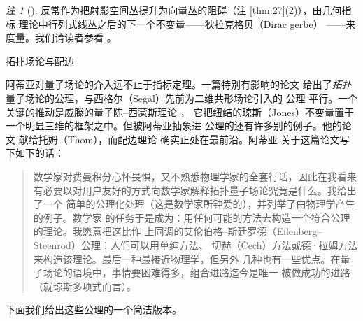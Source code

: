 \documentclass[11pt]{amsart}
\makeatletter
\def\subsection{\@startsection{subsection}{2}%
   \z@{1.25\linespacing\@plus.7\linespacing}{.5\linespacing}%
   {\normalfont\bfseries}}
\theoremstyle{definition}
\theoremstyle{remark}
\newtheorem{remark}[equation]{注}
\theoremstyle{plain}
\numberwithin{equation}{section}
\renewcommand{\:}{\colon}
\newcommand{\QQ}{{\mathbb Q}}
\newcommand{\ZZ}{{\mathbb Z}}
\DeclareMathOperator{\SO}{SO}
\DeclareMathOperator{\Sign}{Sign}
\makeatother
\begin{document}
   \begin{remark}[]\label{thm:33}
  反常作为把射影空间丛提升为向量丛的阻碍（注 \ref{thm:27}(2)），由几何指标
 理论中行列式线丛之后的下一个不变量——狄拉克格贝（Dirac gerbe）
  \cite{Lt1,Bu}——来度量。我们请读者参看 \cite{FS,Seg2,NAg}。
   \end{remark}

   \subsection{拓扑场论与配边}\label{subsec:8.2}

阿蒂亚对量子场论的介入远不止于指标定理。一篇特别有影响的论文 \cite{A11}
给出了\emph{拓扑}量子场论的公理，与西格尔（Segal）先前为二维共形场论引入的
公理 \cite{Seg3} 平行。一个关键的推动是威滕的量子陈–西蒙斯理论 \cite{Wi4}，
它把纽结的琼斯（Jones）不变量置于一个明显三维的框架之中。但被阿蒂亚抽象进
公理的还有许多别的例子。他的论文 \cite{A11} 献给托姆（Thom），而配边理论
确实正处在最前沿。阿蒂亚 \cite{A12} 关于这篇论文写下如下的话：


 \begin{quote} 
 数学家对费曼积分心怀畏惧，又不熟悉物理学家的全套行话，因此在我看来
 有必要以对用户友好的方式向数学家解释拓扑量子场论究竟是什么。我给出了一个
 简单的公理化处理（这是数学家所钟爱的），并列举了由物理学产生的例子。数学家
 的任务于是成为：用任何可能的方法去构造一个符合公理的理论。我愿意把这比作
 上同调的艾伦伯格–斯廷罗德（Eilenberg–Steenrod）公理：人们可以用单纯方法、
 切赫（Čech）方法或德·拉姆方法来构造该理论。最后一种最接近物理学，但另外
 几种也有一些优点。在量子场论的语境中，事情要困难得多，组合进路迄今是唯一
 被做成功的进路（就琼斯多项式而言）。
 \end{quote}

\noindent
下面我们给出这些公理的一个简洁版本。

\end{document}
